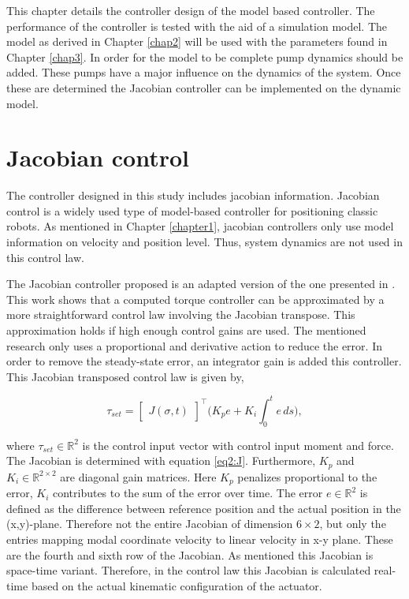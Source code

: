 \label{chap4}

This chapter details the controller design of the model based controller. The performance of the controller is tested with the aid of a simulation model. The model as derived in Chapter \ref{chap2} will be used with the parameters found in Chapter \ref{chap3}. In order for the model to be complete pump dynamics should be added. These pumps have a major influence on the dynamics of the system. Once these are determined the Jacobian controller can be implemented on the dynamic model. 


\section{Jacobian control}


The controller designed in this study includes jacobian information. Jacobian control is a widely used type of model-based controller for positioning classic robots. As mentioned in Chapter \ref{chapter1}, jacobian controllers only use model information on velocity and position level. Thus, system dynamics are not used in this control law.


The Jacobian controller proposed is an adapted version of the one presented in \cite{MOOSAVIAN20071226}. This work shows that a computed torque controller can be approximated by a more straightforward control law involving the Jacobian transpose. This approximation holds if high enough control gains are used. The mentioned research only uses a proportional and derivative action to reduce the error. In order to remove the steady-state error, an integrator gain is added this controller. This Jacobian transposed control law is given by,


\begin{equation}
    \tau_{set} = \begin{bmatrix}J(\sigma,t)\end{bmatrix}^\top \Big(K_p e + K_i \int_0^t e \hspace{2pt} ds \Big), 
    \label{eq:tau}
\end{equation}

where $\tau_{set} \in \mathbb{R}^2$ is the control input vector with control input moment and force. The Jacobian is determined with equation \ref{eq2:J}. Furthermore, $K_p$ and $K_i \in \mathbb{R}^{2\times 2}$ are diagonal gain matrices. Here $K_p$ penalizes proportional to the error, $K_i$ contributes to the sum of the error over time. The error $e \in \mathbb{R}^2$ is defined as the difference between reference position and the actual position in the (x,y)-plane. Therefore not the entire Jacobian of dimension $6 \times 2$, but only the entries mapping modal coordinate velocity to linear velocity in x-y plane. These are the fourth and sixth row of the Jacobian. As mentioned this Jacobian is space-time variant. Therefore, in the control law this Jacobian is calculated real-time based on the actual kinematic configuration of the actuator. 

